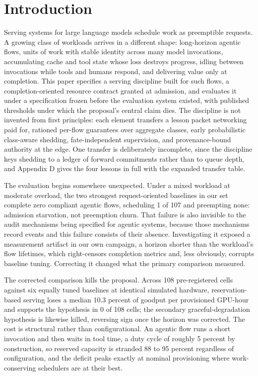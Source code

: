 \section{Introduction}

Serving systems for large language models schedule work as preemptible
requests. A growing class of workloads arrives in a different shape:
long-horizon agentic flows, units of work with stable identity across
many model invocations, accumulating cache and tool state whose loss
destroys progress, idling between invocations while tools and humans
respond, and delivering value only at completion. This paper specifies a
serving discipline built for such flows, a completion-oriented resource
contract granted at admission, and evaluates it under a specification
frozen before the evaluation system existed, with published thresholds
under which the proposal's central claim dies. The discipline is not
invented from first principles: each element transfers a lesson packet
networking paid for, rationed per-flow guarantees over aggregate
classes, early probabilistic class-aware shedding, fate-independent
supervision, and provenance-bound authority at the edge. One transfer is
deliberately incomplete, since the discipline keys shedding to a ledger
of forward commitments rather than to queue depth, and Appendix D gives
the four lessons in full with the expanded transfer table.

The evaluation begins somewhere unexpected. Under a mixed workload at
moderate overload, the two strongest request-oriented baselines in our
set complete zero compliant agentic flows, scheduling 1 of 107 and
preempting none: admission starvation, not preemption churn. That
failure is also invisible to the audit mechanisms being specified for
agentic systems, because those mechanisms record events and this failure
consists of their absence. Investigating it exposed a measurement
artifact in our own campaign, a horizon shorter than the workload's flow
lifetimes, which right-censors completion metrics and, less obviously,
corrupts baseline tuning. Correcting it changed what the primary
comparison measured.

The corrected comparison kills the proposal. Across 108 pre-registered
cells against six equally tuned baselines at identical simulated
hardware, reservation-based serving loses a median 10.3 percent of
goodput per provisioned GPU-hour and supports the hypothesis in 0 of 108
cells; the secondary graceful-degradation hypothesis is likewise killed,
reversing sign once the horizon was corrected. The cost is structural
rather than configurational. An agentic flow runs a short invocation and
then waits in tool time, a duty cycle of roughly 5 percent by
construction, so reserved capacity is stranded 88 to 95 percent
regardless of configuration, and the deficit peaks exactly at nominal
provisioning where work-conserving schedulers are at their best.

